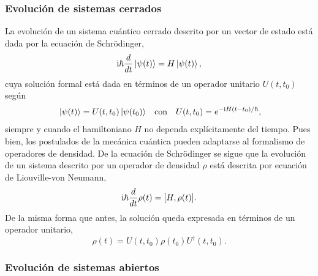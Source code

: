 
\subsubsection{Evolución de sistemas cerrados}

La evolución de un sistema cuántico cerrado descrito por un vector de estado está dada por la ecuación de Schrödinger,
\begin{equation}
    \text{i}\hbar\frac{d}{dt}\ket{\psi(t)}=H\ket{\psi(t)},\nonumber
\end{equation}
cuya solución formal está dada en términos de un operador unitario $U(t,t_{0})$ según
\begin{align}
    \ket{\psi(t)}=U(t,t_{0})\ket{\psi(t_{0})} && \text{con} && U(t,t_{0})=e^{-\rmi H(t-t_{0})/\hbar}\rlap{,}\nonumber
\end{align}
siempre y cuando el hamiltoniano $H$ no dependa explícitamente del tiempo. Pues bien, los postulados de la mecánica cuántica pueden adaptarse al formalismo de operadores de densidad. De la ecuación de Schrödinger se sigue que la evolución de un sistema descrito por un operador de densidad $\rho$ está descrita por ecuación de Liouville-von Neumann,
\begin{equation}
    \text{i}\hbar\frac{d}{d t} \rho(t)=[H,\rho(t)].\nonumber
\end{equation}
De la misma forma que antes, la solución queda expresada en términos de un operador unitario,
\begin{equation}
    \rho(t)=U(t,t_{0})\rho(t_{0})U^{\dagger}(t,t_{0}).\nonumber
\end{equation}

\subsubsection{Evolución de sistemas abiertos}



